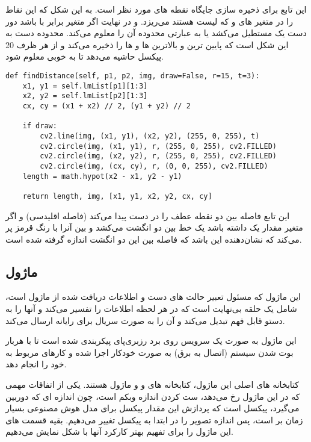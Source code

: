 \documentclass{article}
\begin{document}
این تابع برای ذخیره سازی جایگاه نقطه های مورد نظر است. به این شکل که این نقاط را در متغیر های  و  که لیست هستند می‌ریزد. و در نهایت اگر متغیر  برابر با  باشد دور دست یک مستطیل می‌کشد یا به عبارتی محدوده آن را معلوم می‌کند. محدوده دست به این شکل است که پایین ترین و بالاترین  ها و  ها را ذخیره می‌کند و از هر ظرف 20 پیکسل حاشیه می‌دهد تا به خوبی معلوم شود.

\begin{latin}
\begin{lstlisting}
def findDistance(self, p1, p2, img, draw=False, r=15, t=3):
    x1, y1 = self.lmList[p1][1:3]
    x2, y2 = self.lmList[p2][1:3]
    cx, cy = (x1 + x2) // 2, (y1 + y2) // 2

    if draw:
        cv2.line(img, (x1, y1), (x2, y2), (255, 0, 255), t)
        cv2.circle(img, (x1, y1), r, (255, 0, 255), cv2.FILLED)
        cv2.circle(img, (x2, y2), r, (255, 0, 255), cv2.FILLED)
        cv2.circle(img, (cx, cy), r, (0, 0, 255), cv2.FILLED)
    length = math.hypot(x2 - x1, y2 - y1)

    return length, img, [x1, y1, x2, y2, cx, cy]
\end{lstlisting}
\end{latin}

این تابع فاصله بین دو نقطه عطف را در دست پیدا می‌کند (فاصله اقلیدسی) و اگر متغیر 
مقدار یک داشته باشد یک خط بین دو انگشت می‌کشد و بین آنرا با رنگ قرمز پر می‌کند که نشان‌دهنده این باشد که فاصله بین این دو انگشت اندازه گرفته شده است.

\subsection{ماژول }
این ماژول که مسئول تعبیر حالت های دست و اطلاعات دریافت شده از ماژول  است، شامل یک حلقه  بی‌نهایت است که در هر لحظه اطلاعات را تفسیر می‌کند و آنها را به دستو قابل فهم تبدیل می‌کند و آن را به صورت سریال برای رایانه ارسال می‌کند.

این ماژول به صورت یک سرویس روی برد رزبری‌پای پیکربندی شده است تا با هربار بوت شدن سیستم (اتصال به برق) به صورت خودکار اجرا شده و کارهای مربوط به خود را انجام دهد.

کتابخانه های اصلی این ماژول، کتابخانه های  و  و ماژول  هستند. یکی از اتفاقات مهمی که در این ماژول رخ می‌دهد، ست کردن اندازه وبکم است، چون اندازه ای که دوربین می‌گیرد،  پیکسل است که پردازش این مقدار پیکسل برای مدل هوش مصنوعی بسیار زمان بر است، پس اندازه تصویر را در ابتدا به  پیکسل تغییر می‌دهیم. بقیه قسمت های این ماژول را برای تفهیم بهتر کارکرد آنها با شکل نمایش می‌دهیم.
\end{document}
